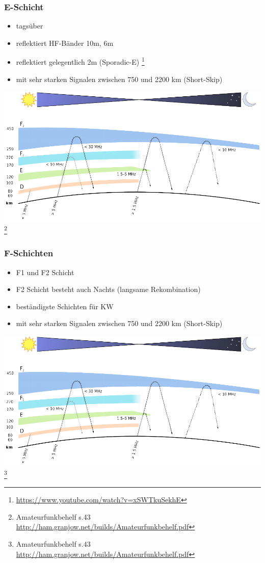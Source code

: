 \begin{frame}
  \frametitle{E-Schicht}
  \begin{itemize}
    \item tagsüber
    \item reflektiert HF-Bänder 10m, 6m
    \item reflektiert gelegentlich 2m (Sporadic-E) \footnote{\tiny \url{https://www.youtube.com/watch?v=xSWTkuSekhE}}
    \item mit sehr starken Signalen zwischen 750 und 2200 km (Short-Skip)
  \end{itemize}
  \begin{center}
    \includegraphics[width=.75\textwidth,height=.5\textheight,keepaspectratio]{a08/schichten_behelf_43.png}
    \footnote{\tiny Amateurfunkbehelf s.43 \url{http://ham.granjow.net/builds/Amateurfunkbehelf.pdf}}
  \end{center}
\end{frame}

\begin{frame}
  \frametitle{F-Schichten}
  \begin{itemize}
    \item F1 und F2 Schicht
    \item F2 Schicht besteht auch Nachts (langsame Rekombination)
    \item beständigste Schichten für KW
    \item mit sehr starken Signalen zwischen 750 und 2200 km (Short-Skip)
  \end{itemize}
  \begin{center}
    \includegraphics[width=.75\textwidth,height=.5\textheight,keepaspectratio]{a08/schichten_behelf_43.png}
    \footnote{\tiny Amateurfunkbehelf s.43 \url{http://ham.granjow.net/builds/Amateurfunkbehelf.pdf}}
  \end{center}
\end{frame}

